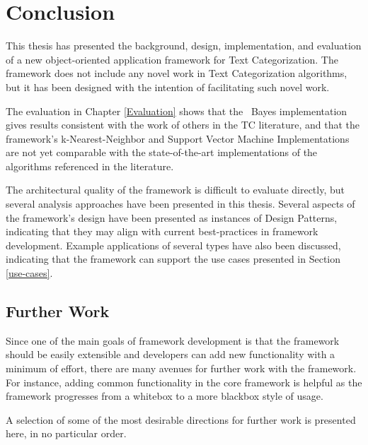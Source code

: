 \chapter{Conclusion}
\label{Conclusion}

This thesis has presented the background, design, implementation, and
evaluation of a new object-oriented application framework for Text
Categorization.  The framework does not include any novel work in Text
Categorization algorithms, but it has been designed with the intention
of facilitating such novel work.

The evaluation in Chapter \ref{Evaluation} shows that the \naive\
Bayes implementation gives results consistent with the work of others
in the TC literature, and that the framework's k-Nearest-Neighbor and
Support Vector Machine Implementations are not yet comparable with the
state-of-the-art implementations of the algorithms referenced in the
literature.

The architectural quality of the framework is difficult to evaluate
directly, but several analysis approaches have been presented in this
thesis.  Several aspects of the framework's design have been presented
as instances of Design Patterns, indicating that they may align with
current best-practices in framework development.  Example applications
of several types have also been discussed, indicating that the
framework can support the use cases presented in Section
\ref{use-cases}.

\section{Further Work}

Since one of the main goals of framework development is that the
framework should be easily extensible and developers can add new
functionality with a minimum of effort, there are many avenues for
further work with the framework.  For instance, adding common
functionality in the core framework is helpful as the framework
progresses from a whitebox to a more blackbox style of usage.

A selection of some of the most desirable directions for further work
is presented here, in no particular order.

